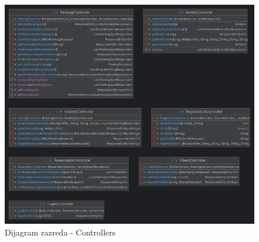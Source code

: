\begin{figure}[H]
	\includegraphics[width=\textwidth]{slike/controllers.png} %
	\centering
	\caption{Dijagram razreda - Controllers}
\end{figure}

